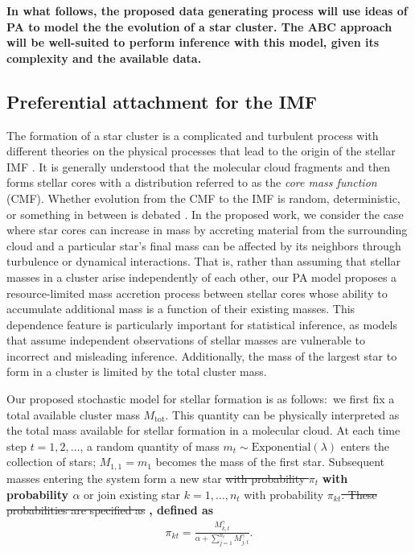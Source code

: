 \documentclass[ejs]{imsart}
\numberwithin{equation}{section}
\theoremstyle{plain}
\newcommand{\new}[1]{{\bf #1}}
\newcommand{\remove}[1]{\st{#1}}
\newcommand{\Mtot}{M_{\text{tot}}}
\begin{document}
\new{
In what follows, the proposed data generating process will use ideas of PA
to model the the evolution of a star cluster. The ABC approach will be
well-suited to perform inference with this model, given its complexity and
the available data.
}

\subsection{Preferential attachment for the IMF} \label{sec:pa}
The formation of a star cluster is a complicated and turbulent process with different theories on the physical processes that lead to the origin of the stellar IMF \citep{chabrier2005, Bate2012, OffnerEtAl2014, Pokhrel:2018nr}.  It is generally understood that the molecular cloud fragments and then forms stellar cores with a distribution referred to as the \emph{core mass function} (CMF).  Whether evolution from the CMF to the IMF is random, deterministic, or something in between is debated \citep{OffnerEtAl2014}.  In the proposed work, we consider the case where star cores can increase in mass by accreting material from the surrounding cloud and a particular star's final mass can be affected by its neighbors through turbulence or dynamical interactions.
%
That is, rather than assuming that stellar masses in a cluster arise independently of each other, our PA model proposes a resource-limited mass accretion process between stellar cores whose ability to accumulate additional mass is a function of their existing masses. 
This dependence feature is particularly important for statistical inference, as models that assume independent observations of stellar masses are vulnerable to incorrect and misleading inference. 
Additionally, the mass of the largest star to form in a cluster is limited by the total cluster mass.



Our proposed stochastic model for stellar formation is as follows:~we first fix a total available cluster mass $\Mtot$. 
This quantity can be physically interpreted as the total mass available for stellar formation in a molecular cloud. 
At each time step $t = 1, 2, \ldots$, a random quantity of mass $m_t \sim \text{Exponential}(\lambda)$ enters the collection of stars; $M_{1,1} = m_1$ becomes the mass of the first star.
Subsequent masses entering the system form a new star \remove{with probability $\pi_t$} \new{with probability $\alpha$} or join existing star $k = 1, \ldots, n_t$ with probability $\pi_{kt}$\remove{.
These probabilities are specified as} \new{, defined as}
\begin{align}
	\pi_{kt} = \frac{M_{k,t}^{\gamma}}{\alpha+ \sum_{j = 1}^{n_t} M_{j,t}^{\gamma}} \text{.}
\label{eq:PAstars}
\end{align}
\end{document}
